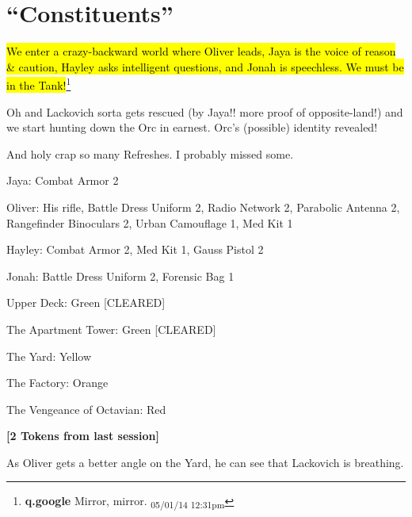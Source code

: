 \setcounter{chapter}{ 21 }
\chapter{\textbf{``Constituents''} }






\hl{We enter a crazy-backward world where Oliver leads, Jaya is the voice of reason \& caution, Hayley asks intelligent questions, and Jonah is speechless.  We must be in the Tank!}\footnote{\textbf{q.google }Mirror, mirror. \textsubscript{05/01/14 12:31pm}}



Oh and Lackovich sorta gets rescued (by Jaya!!  more proof of opposite-land!) and we start hunting down the Orc in earnest.  Orc's (possible) identity revealed!



And holy crap so many Refreshes.  I probably missed some.







{
\parskip=0pt
Jaya: Combat Armor 2

Oliver: His rifle, Battle Dress Uniform 2, Radio Network 2, Parabolic Antenna 2, Rangefinder Binoculars 2, Urban Camouflage 1, Med Kit 1

Hayley: Combat Armor 2, Med Kit 1, Gauss Pistol 2

Jonah: Battle Dress Uniform 2, Forensic Bag 1
}


{
\parskip=0pt
Upper Deck: Green {[}CLEARED{]}

The Apartment Tower: Green {[}CLEARED{]}

The Yard: Yellow

The Factory: Orange

The Vengeance of Octavian: Red
}




\textbf{{[}2 Tokens from last session{]}}



As Oliver gets a better angle on the Yard, he can see that Lackovich is breathing.  



